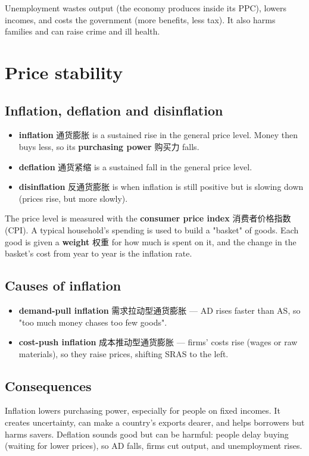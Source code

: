\documentclass[11pt]{article}
\begin{document}
Unemployment wastes output (the economy produces inside its PPC), lowers incomes, and costs the government (more benefits, less tax). It also harms families and can raise crime and ill health.

\section*{Price stability}

\subsection*{Inflation, deflation and disinflation}

\begin{itemize}
\item \textbf{inflation} 通货膨胀 is a sustained rise in the general price level. Money then buys less, so its \textbf{purchasing power} 购买力 falls.

\item \textbf{deflation} 通货紧缩 is a sustained fall in the general price level.

\item \textbf{disinflation} 反通货膨胀 is when inflation is still positive but is slowing down (prices rise, but more slowly).

\end{itemize}

The price level is measured with the \textbf{consumer price index} 消费者价格指数 (CPI). A typical household's spending is used to build a "basket" of goods. Each good is given a \textbf{weight} 权重 for how much is spent on it, and the change in the basket's cost from year to year is the inflation rate.

\subsection*{Causes of inflation}

\begin{itemize}
\item \textbf{demand-pull inflation} 需求拉动型通货膨胀 — AD rises faster than AS, so "too much money chases too few goods".

\item \textbf{cost-push inflation} 成本推动型通货膨胀 — firms' costs rise (wages or raw materials), so they raise prices, shifting SRAS to the left.

\end{itemize}

\subsection*{Consequences}

Inflation lowers purchasing power, especially for people on fixed incomes. It creates uncertainty, can make a country's exports dearer, and helps borrowers but harms savers. Deflation sounds good but can be harmful: people delay buying (waiting for lower prices), so AD falls, firms cut output, and unemployment rises.
\end{document}
